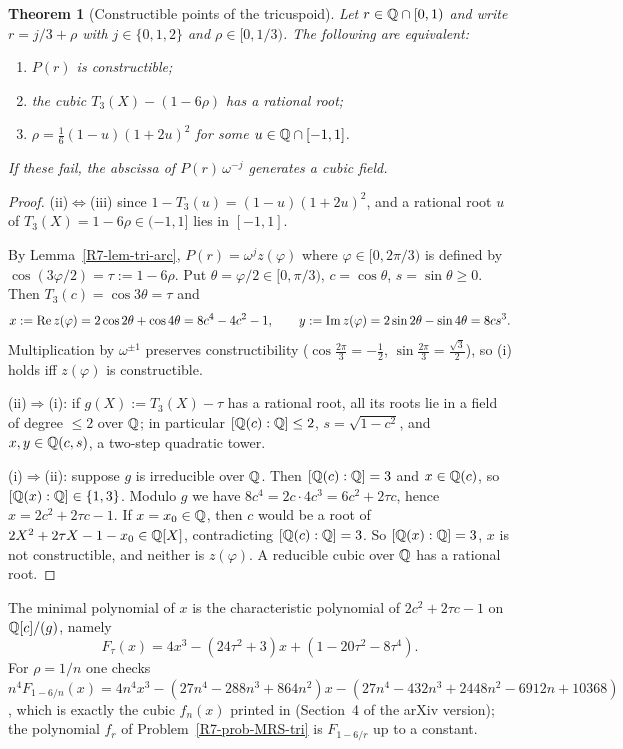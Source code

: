 \documentclass[11pt]{amsart}
\newtheorem{theorem}{Theorem}[section]
\theoremstyle{definition}
\theoremstyle{remark}
\begin{document}
\begin{theorem}[Constructible points of the tricuspoid]
\label{R7-thm-tricuspoid}
Let $r\in\mathbb{Q}\cap[0,1)$ and write $r=j/3+\rho$ with $j\in\{0,1,2\}$ and
$\rho\in[0,1/3)$. The following are equivalent:
\begin{enumerate}
\item[(i)] $P(r)$ is constructible;
\item[(ii)] the cubic $T_3(X)-(1-6\rho)$ has a rational root;
\item[(iii)] $\rho=\tfrac16(1-u)(1+2u)^2$ for some $u\in\mathbb{Q}\cap[-1,1]$.
\end{enumerate}
If these fail, the abscissa of $P(r)\,\omega^{-j}$ generates a cubic field.
\end{theorem}

\begin{proof}
(ii)$\Leftrightarrow$(iii) since $1-T_3(u)=(1-u)(1+2u)^2$, and a rational
root $u$ of $T_3(X)=1-6\rho\in(-1,1]$ lies in $[-1,1]$.

By Lemma~\ref{R7-lem-tri-arc}, $P(r)=\omega^jz(\varphi)$ where
$\varphi\in[0,2\pi/3)$ is defined by $\cos(3\varphi/2)=\tau:=1-6\rho$.
Put $\theta=\varphi/2\in[0,\pi/3)$, $c=\cos\theta$, $s=\sin\theta\ge0$. Then
$T_3(c)=\cos3\theta=\tau$ and
\[
 x:=\operatorname{Re} z(\varphi)=2\cos2\theta+\cos4\theta=8c^4-4c^2-1,\qquad
 y:=\operatorname{Im} z(\varphi)=2\sin2\theta-\sin4\theta=8cs^3 .
\]
Multiplication by $\omega^{\pm1}$ preserves constructibility
($\cos\frac{2\pi}3=-\frac12$, $\sin\frac{2\pi}3=\frac{\sqrt3}2$), so (i) holds
iff $z(\varphi)$ is constructible.

(ii)$\Rightarrow$(i): if $g(X):=T_3(X)-\tau$ has a rational root, all its
roots lie in a field of degree $\le2$ over $\mathbb{Q}$; in particular
$[\mathbb{Q}(c):\mathbb{Q}]\le2$, $s=\sqrt{1-c^2}$, and $x,y\in\mathbb{Q}(c,s)$, a
two-step quadratic tower.

(i)$\Rightarrow$(ii): suppose $g$ is irreducible over $\mathbb{Q}$. Then
$[\mathbb{Q}(c):\mathbb{Q}]=3$ and $x\in\mathbb{Q}(c)$, so $[\mathbb{Q}(x):\mathbb{Q}]\in\{1,3\}$.
Modulo $g$ we have $8c^4=2c\cdot4c^3=6c^2+2\tau c$, hence
$x=2c^2+2\tau c-1$. If $x=x_0\in\mathbb{Q}$, then $c$ would be a root of
$2X^2+2\tau X-1-x_0\in\mathbb{Q}[X]$, contradicting $[\mathbb{Q}(c):\mathbb{Q}]=3$.
So $[\mathbb{Q}(x):\mathbb{Q}]=3$, $x$ is not constructible, and neither is
$z(\varphi)$. A reducible cubic over $\mathbb{Q}$ has a rational root.
\end{proof}

The minimal polynomial of $x$ is the characteristic polynomial of
$2c^2+2\tau c-1$ on $\mathbb{Q}[c]/(g)$, namely
\begin{equation}\label{R7-eq-tri-cubic}
 F_\tau(x)=4x^3-(24\tau^2+3)x+(1-20\tau^2-8\tau^4).
\end{equation}
For $\rho=1/n$ one checks $n^4F_{1-6/n}(x)=4n^4x^3-(27n^4-288n^3+864n^2)x
-(27n^4-432n^3+2448n^2-6912n+10368)$, which is exactly the cubic $f_n(x)$
printed in \cite[Section~5]{R7-MRS16} (Section~4 of the arXiv version); the polynomial $f_r$ of
Problem~\ref{R7-prob-MRS-tri} is $F_{1-6/r}$ up to a constant.
\end{document}

